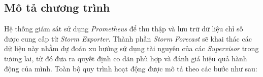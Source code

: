 \subsection{Mô tả chương trình}



Hệ thống giám sát sử dụng \textit{Prometheus} để thu thập và lưu trữ dữ liệu chỉ số được cung cấp từ \textit{Storm Exporter}. Thành phần \textit{Storm Forecast} sẽ khai thác các dữ liệu này nhằm dự đoán xu hướng sử dụng tài nguyên của các \textit{Supervisor} trong tương lai, từ đó đưa ra quyết định co dãn phù hợp và đánh giá hiệu quả hành động của mình. Toàn bộ quy trình hoạt động được mô tả theo các bước như sau:

